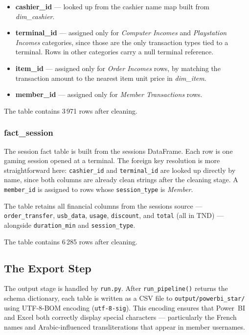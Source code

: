 \begin{itemize}[noitemsep]
  \item \textbf{cashier\_id} — looked up from the cashier name map built from
        \textit{dim\_cashier}.
  \item \textbf{terminal\_id} — assigned only for \textit{Computer Incomes} and
        \textit{Playstation Incomes} categories, since those are the only transaction
        types tied to a terminal. Rows in other categories carry a null terminal
        reference.
  \item \textbf{item\_id} — assigned only for \textit{Order Incomes} rows, by
        matching the transaction amount to the nearest item unit price in
        \textit{dim\_item}.
  \item \textbf{member\_id} — assigned only for \textit{Member Transactions} rows.
\end{itemize}

The table contains 3\,971 rows after cleaning.

\subsubsection{fact\_session}

The session fact table is built from the sessions DataFrame. Each row is one gaming
session opened at a terminal. The foreign key resolution is more straightforward here:
\texttt{cashier\_id} and \texttt{terminal\_id} are looked up directly by name, since
both columns are already clean strings after the cleaning stage. A \texttt{member\_id}
is assigned to rows whose \texttt{session\_type} is \textit{Member}.

The table retains all financial columns from the sessions source — \texttt{order\_transfer},
\texttt{usb\_data}, \texttt{usage}, \texttt{discount}, and \texttt{total} (all in TND)
— alongside \texttt{duration\_min} and \texttt{session\_type}.

The table contains 6\,285 rows after cleaning.

\subsection{The Export Step}

The output stage is handled by \texttt{run.py}. After \texttt{run\_pipeline()} returns
the schema dictionary, each table is written as a CSV file to
\texttt{output/powerbi\_star/} using UTF-8-BOM encoding (\texttt{utf-8-sig}). This
encoding ensures that Power~BI and Excel both correctly display special characters —
particularly the French names and Arabic-influenced transliterations that appear in
member usernames.

